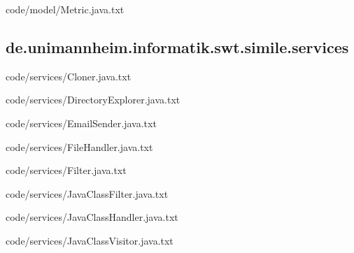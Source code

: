 
{code/model/Metric.java.txt}
\subsection{de.unimannheim.informatik.swt.simile.services}

{code/services/Cloner.java.txt}


{code/services/DirectoryExplorer.java.txt}


{code/services/EmailSender.java.txt}


{code/services/FileHandler.java.txt}


{code/services/Filter.java.txt}


{code/services/JavaClassFilter.java.txt}


{code/services/JavaClassHandler.java.txt}


{code/services/JavaClassVisitor.java.txt}

